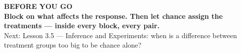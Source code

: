 \documentclass[aspectratio=169, 11pt]{beamer}
\begin{document}
{
\begin{frame}[plain]
  \vspace{1.5cm}\hspace{0.8cm}%
  \begin{minipage}{0.86\textwidth}
    {\color{goldacc}\bfseries\small BEFORE YOU GO}\\[0.7cm]
    {\color{white}\bfseries\Large Block on what affects the response. Then let chance assign
    the treatments --- inside every block, every pair.}\\[0.9cm]
    {\color{skymid}\small Next: Lesson 3.5 --- Inference and Experiments: when is a difference
    between treatment groups too big to be chance alone?}
  \end{minipage}
\end{frame}
}
\end{document}
